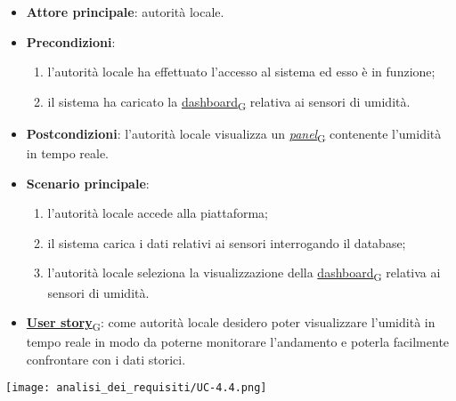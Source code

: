 \begin{itemize}
	\item \textbf{Attore principale}: autorità locale.
	\item \textbf{Precondizioni}:
	      \begin{enumerate}
		      \item l'autorità locale ha effettuato l'accesso al sistema ed esso è in funzione;
		      \item il sistema ha caricato la \href{https://7last.github.io/docs/pb/documentazione-interna/glossario\#dashboard}{dashboard\textsubscript{G}} relativa ai sensori di umidità.
	      \end{enumerate}
	\item \textbf{Postcondizioni}: l'autorità locale visualizza un \href{https://7last.github.io/docs/pb/documentazione-interna/glossario\#panel}{\textit{panel}\textsubscript{G}} contenente l'umidità in tempo reale.
	\item \textbf{Scenario principale}:
	      \begin{enumerate}
		      \item l'autorità locale accede alla piattaforma;
		      \item il sistema carica i dati relativi ai sensori interrogando il database;
		      \item l'autorità locale seleziona la visualizzazione della \href{https://7last.github.io/docs/pb/documentazione-interna/glossario\#dashboard}{dashboard\textsubscript{G}} relativa ai sensori di umidità.
	      \end{enumerate}
	\item \href{https://7last.github.io/docs/pb/documentazione-interna/glossario\#user-story}{\textbf{User story}\textsubscript{G}}:
	      come autorità locale desidero poter visualizzare l'umidità in tempo reale in modo da poterne monitorare l'andamento
	      e poterla facilmente confrontare con i dati storici.
\end{itemize}
\begin{center}
	\texttt{[image: analisi\_dei\_requisiti/UC-4.4.png]}
\end{center}


